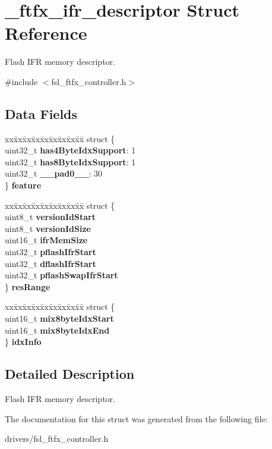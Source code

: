 \hypertarget{struct__ftfx__ifr__descriptor}{}\section{\+\_\+ftfx\+\_\+ifr\+\_\+descriptor Struct Reference}
\label{struct__ftfx__ifr__descriptor}


Flash I\+FR memory descriptor.  




{\ttfamily \#include $<$fsl\+\_\+ftfx\+\_\+controller.\+h$>$}

\subsection*{Data Fields}
\begin{DoxyCompactItemize}
\item 
\begin{tabbing}
xx\=xx\=xx\=xx\=xx\=xx\=xx\=xx\=xx\=\kill
struct \{\\
\>uint32\_t {\bfseries has4ByteIdxSupport}: 1\\
\>uint32\_t {\bfseries has8ByteIdxSupport}: 1\\
\>uint32\_t {\bfseries \_\_pad0\_\_}: 30\\
\} {\bfseries feature}\\

\end{tabbing}\item 
\begin{tabbing}
xx\=xx\=xx\=xx\=xx\=xx\=xx\=xx\=xx\=\kill
struct \{\\
\>uint8\_t {\bfseries versionIdStart}\\
\>uint8\_t {\bfseries versionIdSize}\\
\>uint16\_t {\bfseries ifrMemSize}\\
\>uint32\_t {\bfseries pflashIfrStart}\\
\>uint32\_t {\bfseries dflashIfrStart}\\
\>uint32\_t {\bfseries pflashSwapIfrStart}\\
\} {\bfseries resRange}\\

\end{tabbing}\item 
\begin{tabbing}
xx\=xx\=xx\=xx\=xx\=xx\=xx\=xx\=xx\=\kill
struct \{\\
\>uint16\_t {\bfseries mix8byteIdxStart}\\
\>uint16\_t {\bfseries mix8byteIdxEnd}\\
\} {\bfseries idxInfo}\\

\end{tabbing}\end{DoxyCompactItemize}


\subsection{Detailed Description}
Flash I\+FR memory descriptor. 

The documentation for this struct was generated from the following file\+:\begin{DoxyCompactItemize}
\item 
drivers/fsl\+\_\+ftfx\+\_\+controller.\+h\end{DoxyCompactItemize}
